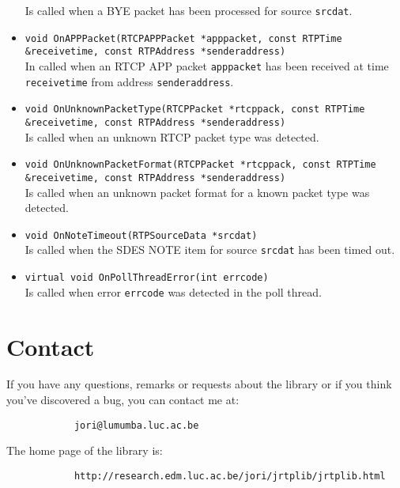 \documentclass[12pt,a4paper]{article}
\begin{document}
\begin{itemize}
						Is called when a BYE packet has been processed for source
						{\tt srcdat}.
					\item {\tt void OnAPPPacket(RTCPAPPPacket *apppacket, const RTPTime \&receivetime,
					                                    const RTPAddress *senderaddress)}\\
						In called when an RTCP APP packet {\tt apppacket} has been received 
						at time {\tt receivetime} from address {\tt senderaddress}.
					\item {\tt void OnUnknownPacketType(RTCPPacket *rtcppack, const RTPTime \&receivetime,
					                                            const RTPAddress *senderaddress)}\\
						Is called when an unknown RTCP packet type was detected.
					\item {\tt void OnUnknownPacketFormat(RTCPPacket *rtcppack, const RTPTime \&receivetime,
					                                              const RTPAddress *senderaddress)}\\
						Is called when an unknown packet format for a known packet
						type was detected.
					\item {\tt void OnNoteTimeout(RTPSourceData *srcdat)}\\
						Is called when the SDES NOTE item for source {\tt srcdat}
						has been timed out.
					\item {\tt virtual void OnPollThreadError(int errcode)}\\
						Is called when error {\tt errcode} was detected in the
						poll thread.
				\end{itemize}

	\section{Contact}
		
		If you have any questions, remarks or requests about the library or
		if you think you've discovered a bug, you can contact me at:
		\begin{verbatim}
			jori@lumumba.luc.ac.be
		\end{verbatim}
		
		The home page of the library is:
		\begin{verbatim}
			http://research.edm.luc.ac.be/jori/jrtplib/jrtplib.html
		\end{verbatim}
\end{document}

